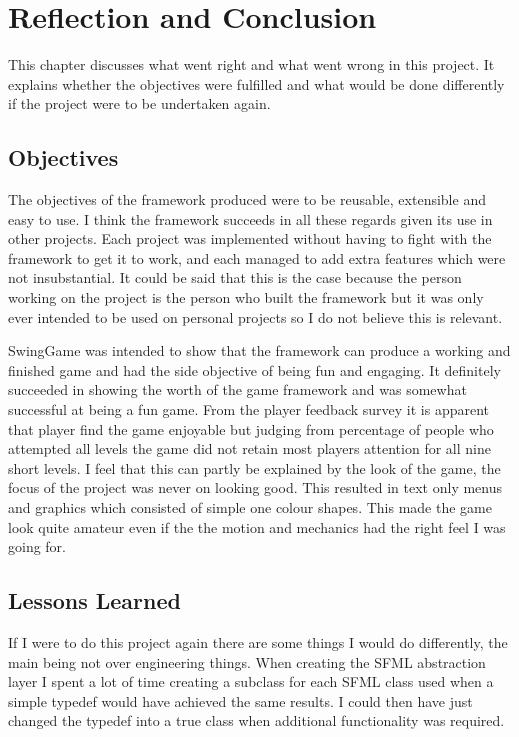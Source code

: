 \documentclass[]{report}
\begin{document}
\chapter{Reflection and Conclusion}
This chapter discusses what went right and what went wrong in this project. It explains whether the objectives were fulfilled and what would be done differently if the project were to be undertaken again.
	\section{Objectives}
	The objectives of the framework produced were to be reusable, extensible and easy to use. I think the framework succeeds in all these regards given its use in other projects. Each project was implemented without having to fight with the framework to get it to work, and each managed to add extra features which were not insubstantial. It could be said that this is the case because the person working on the project is the person who built the framework but it was only ever intended to be used on personal projects so I do not believe this is relevant.
	
	SwingGame was intended to show that the framework can produce a working and finished game and had the side objective of being fun and engaging. It definitely succeeded in showing the worth of the game framework and was somewhat successful at being a fun game. From the player feedback survey it is apparent that player find the game enjoyable but judging from percentage of people who attempted all levels the game did not retain most players attention for all nine short levels. I feel that this can partly be explained by the look of the game, the focus of the project was never on looking good. This resulted in text only menus and graphics which consisted of simple one colour shapes. This made the game look quite amateur even if the the motion and mechanics had the right feel I was going for.
	
	\section{Lessons Learned}
	If I were to do this project again there are some things I would do differently, the main being not over engineering things. When creating the SFML abstraction layer I spent a lot of time creating a subclass for each SFML class used when a simple typedef would have achieved the same results. I could then have just changed the typedef into a true class when additional functionality was required.
	
\end{document}
